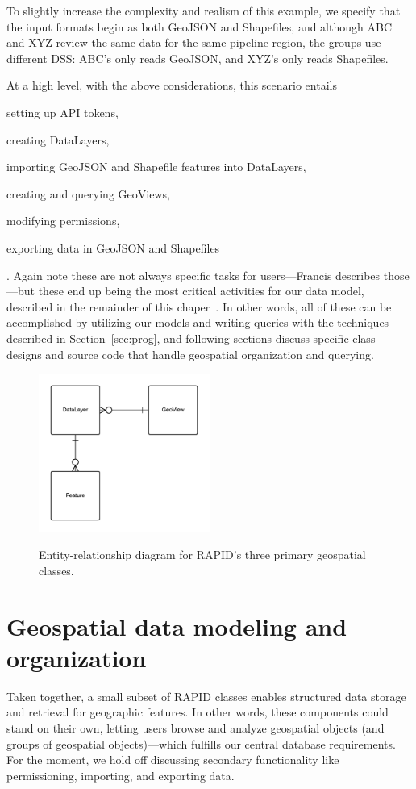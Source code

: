 To slightly increase the complexity and realism of this example, we specify that the input formats begin as both GeoJSON and Shapefiles, and although ABC and XYZ review the same data for the same pipeline region, the groups use different DSS: ABC's only reads GeoJSON, and XYZ's only reads Shapefiles.

At a high level, with the above considerations, this scenario entails
\begin{enumerate*}[label=\itshape\alph*\upshape)]
\item setting up API tokens,
\item creating DataLayers,
\item importing GeoJSON and Shapefile features into DataLayers,
\item creating and querying GeoViews,
\item modifying permissions,
\item exporting data in GeoJSON and Shapefiles
\end{enumerate*}. Again note these are not always specific tasks for users---Francis describes those---but these end up being the most critical activities for our data model, described in the remainder of this chaper~\cite{Francis}. In other words, all of these can be accomplished by utilizing our models and writing queries with the techniques described in Section~\ref{sec:prog}, and following sections discuss specific class designs and source code that handle geospatial organization and querying. 

\begin{figure}[ht]
    \caption{Entity-relationship diagram for RAPID's three primary geospatial classes.}
    \centering
    \includegraphics[width=0.5\textwidth]{figures/3er.png}
    \label{fig:3er}
\end{figure}

\section{Geospatial data modeling and organization}
Taken together, a small subset of RAPID classes enables structured data storage and retrieval for geographic features. In other words, these components could stand on their own, letting users browse and analyze geospatial objects (and groups of geospatial objects)---which fulfills our central database requirements. For the moment, we hold off discussing secondary functionality like permissioning, importing, and exporting data.

